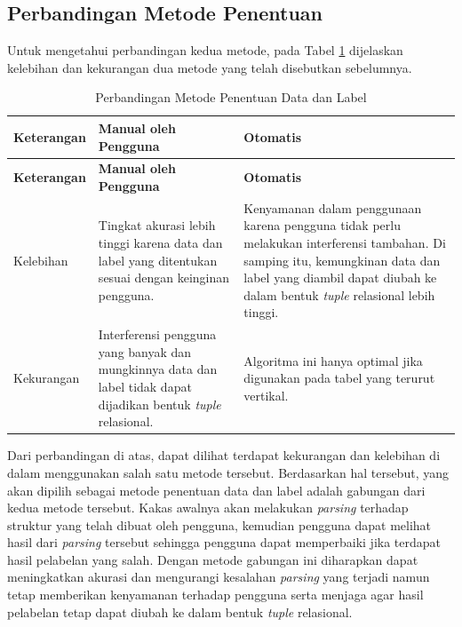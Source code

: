 	\subsection{Perbandingan Metode Penentuan}
	Untuk mengetahui perbandingan kedua metode, pada Tabel \ref{MetodePenentuan} dijelaskan kelebihan dan kekurangan dua metode yang telah disebutkan sebelumnya.
	\begin{small}
	\begin{longtable}{ | p{3cm} | p{4cm} | p{4cm} | }
	    \caption{Perbandingan Metode Penentuan Data dan Label}
	    \label{MetodePenentuan}\\ \hline
	    \centering\bfseries{Keterangan} & \centering\bfseries{Manual oleh Pengguna} & \centering\bfseries{Otomatis} \tabularnewline \hline
	    \endfirsthead
	    \hline
	    \centering\bfseries{Keterangan} & \centering\bfseries{Manual oleh Pengguna} & \centering\bfseries{Otomatis} \tabularnewline \hline
	    \endhead
	    Kelebihan & Tingkat akurasi lebih tinggi karena data dan label yang ditentukan sesuai dengan keinginan pengguna. & Kenyamanan dalam penggunaan karena pengguna tidak perlu melakukan interferensi tambahan. Di samping itu, kemungkinan data dan label yang diambil dapat diubah ke dalam bentuk \textit{tuple} relasional lebih tinggi. \\ \hline
	    Kekurangan & Interferensi pengguna yang banyak dan mungkinnya data dan label tidak dapat dijadikan bentuk \textit{tuple} relasional. & Algoritma ini hanya optimal jika digunakan pada tabel yang terurut vertikal. \\ \hline
  	\end{longtable}
	\end{small}
  	Dari perbandingan di atas, dapat dilihat terdapat kekurangan dan kelebihan di dalam menggunakan salah satu metode tersebut. Berdasarkan hal tersebut, yang akan dipilih sebagai metode penentuan data dan label adalah gabungan dari kedua metode tersebut. Kakas awalnya akan melakukan \textit{parsing} terhadap struktur yang telah dibuat oleh pengguna, kemudian pengguna dapat melihat hasil dari \textit{parsing} tersebut sehingga pengguna dapat memperbaiki jika terdapat hasil pelabelan yang salah. Dengan metode gabungan ini diharapkan dapat meningkatkan akurasi dan mengurangi kesalahan \textit{parsing} yang terjadi namun tetap memberikan kenyamanan terhadap pengguna serta menjaga agar hasil pelabelan tetap dapat diubah ke dalam bentuk \textit{tuple} relasional.

